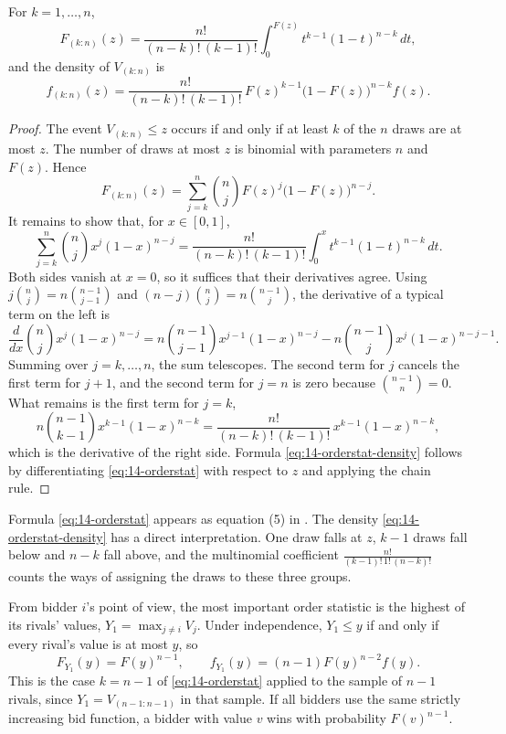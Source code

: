 \begin{proposition}\label{prop:14-orderstat}
For $k=1,\dots,n$,
\begin{equation}\label{eq:14-orderstat}
F_{(k:n)}(z)=\frac{n!}{(n-k)!\,(k-1)!}\int_0^{F(z)}t^{k-1}(1-t)^{n-k}\,dt,
\end{equation}
and the density of $V_{(k:n)}$ is
\begin{equation}\label{eq:14-orderstat-density}
f_{(k:n)}(z)=\frac{n!}{(n-k)!\,(k-1)!}\,F(z)^{k-1}\bigl(1-F(z)\bigr)^{n-k}f(z).
\end{equation}
\end{proposition}

\begin{proof}
The event $V_{(k:n)}\le z$ occurs if and only if at least $k$ of the $n$ draws are at most $z$. The number of
draws at most $z$ is binomial with parameters $n$ and $F(z)$. Hence
\begin{equation}\label{eq:14-orderstat-binom}
F_{(k:n)}(z)=\sum_{j=k}^{n}\binom{n}{j}F(z)^j\bigl(1-F(z)\bigr)^{n-j}.
\end{equation}
It remains to show that, for $x\in[0,1]$,
\[
\sum_{j=k}^{n}\binom{n}{j}x^j(1-x)^{n-j}=\frac{n!}{(n-k)!\,(k-1)!}\int_0^{x}t^{k-1}(1-t)^{n-k}\,dt.
\]
Both sides vanish at $x=0$, so it suffices that their derivatives agree. Using
$j\binom{n}{j}=n\binom{n-1}{j-1}$ and $(n-j)\binom{n}{j}=n\binom{n-1}{j}$, the derivative of a typical term on the
left is
\[
\frac{d}{dx}\binom{n}{j}x^j(1-x)^{n-j}=n\binom{n-1}{j-1}x^{j-1}(1-x)^{n-j}-n\binom{n-1}{j}x^{j}(1-x)^{n-j-1}.
\]
Summing over $j=k,\dots,n$, the sum telescopes. The second term for $j$ cancels the first term for $j+1$,
and the second term for $j=n$ is zero because $\binom{n-1}{n}=0$. What remains is the first term for $j=k$,
\[
n\binom{n-1}{k-1}x^{k-1}(1-x)^{n-k}=\frac{n!}{(n-k)!\,(k-1)!}\,x^{k-1}(1-x)^{n-k},
\]
which is the derivative of the right side. Formula \eqref{eq:14-orderstat-density} follows by differentiating
\eqref{eq:14-orderstat} with respect to $z$ and applying the chain rule.
\end{proof}

Formula \eqref{eq:14-orderstat} appears as equation (5) in \citet{AtheyHaile2002}. The density
\eqref{eq:14-orderstat-density} has a direct interpretation. One draw falls at $z$, $k-1$ draws fall below
and $n-k$ fall above, and the multinomial coefficient $\frac{n!}{(k-1)!\,1!\,(n-k)!}$ counts the ways of
assigning the draws to these three groups.

From bidder $i$'s point of view, the most important order statistic is the highest of its rivals' values,
$Y_1=\max_{j\neq i}V_j$. Under independence, $Y_1\le y$ if and only if every rival's value is at most $y$, so
\begin{equation}\label{eq:14-highest-rival}
F_{Y_1}(y)=F(y)^{n-1},\qquad f_{Y_1}(y)=(n-1)F(y)^{n-2}f(y).
\end{equation}
This is the case $k=n-1$ of \eqref{eq:14-orderstat} applied to the sample of $n-1$ rivals, since
$Y_1=V_{(n-1:n-1)}$ in that sample. If all bidders use the same strictly increasing bid function, a bidder
with value $v$ wins with probability $F(v)^{n-1}$.

